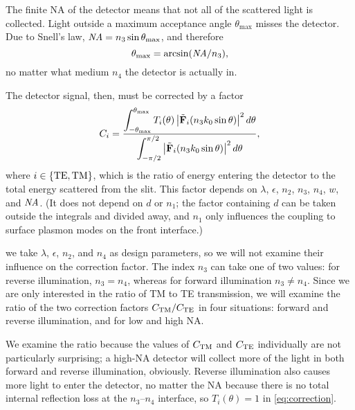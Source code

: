 The finite \gls{NA} of the detector means that not all of the scattered light is collected.
Light outside a maximum acceptance angle $\theta_\mathrm{max}$ misses the detector.
Due to Snell's law, $\mbox{\em NA}=n_3\sin\theta_\mathrm{max}$, and therefore
\begin{equation}
\theta_\mathrm{max} = \arcsin(\mbox{\em NA}/n_3),
\end{equation}
no matter what medium $n_4$ the detector is actually in.

The detector signal, then, must be corrected by a factor
\begin{equation}\label{eq:correction}
C_i = \frac{ \displaystyle
	\int_{-\theta_\mathrm{max}}^{\theta_\mathrm{max}}
		T_i(\theta)
		\left| \tilde{\mathbf{F}}_i (n_3 k_0 \sin\theta) \right|^2
	d\theta
}{ \displaystyle
	\int_{-\pi/2}^{\pi/2}
		\left| \tilde{\mathbf{F}}_i (n_3 k_0 \sin\theta) \right|^2
	d\theta
},
\end{equation}
where $i\in\{\text{TE}, \text{TM}\}$, which is the ratio of energy entering the detector to the total energy scattered from the slit.
This factor depends on $\lambda$, $\epsilon$, $n_2$, $n_3$, $n_4$, $w$, and $\mbox{\em NA}$.
(It does not depend on $d$ or $n_1$; the factor containing $d$ can be taken outside the integrals and divided away, and $n_1$ only influences the coupling to surface plasmon modes on the front interface.)

 we take $\lambda$, $\epsilon$, $n_2$, and $n_4$ as design parameters, so we will not examine their influence on the correction factor.
The index $n_3$ can take one of two values: for reverse illumination, $n_3 = n_4$, whereas for forward illumination $n_3 \neq n_4$.
Since we are only interested in the ratio of \gls{TM} to \gls{TE} transmission, we will examine the ratio of the two correction factors $C_{\text{TM}}/C_{\text{TE}}$ in four situations: forward and reverse illumination, and for low and high \gls{NA}.

We examine the ratio because the values of $C_{\text{TM}}$ and $C_{\text{TE}}$ individually are not particularly surprising; a high-\gls{NA} detector will collect more of the light in both forward and reverse illumination, obviously.
Reverse illumination also causes more light to enter the detector, no matter the \gls{NA} because there is no total internal reflection loss at the $n_3$--$n_4$ interface, so $T_i(\theta) = 1$ in \eqref{eq:correction}.

